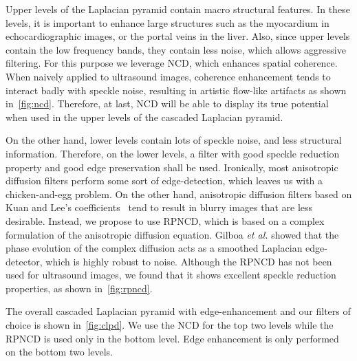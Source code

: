 %

Upper levels of the Laplacian pyramid contain macro structural features.
In these levels, it is important to enhance large structures such as the myocardium in echocardiographic images, or the portal veins in the liver.
Also, since upper levels contain the low frequency bands, they contain less noise, which allows aggressive filtering.
For this purpose we leverage NCD, which enhances spatial coherence.
When naively applied to ultrasound images, coherence enhancement tends to interact badly with speckle noise, resulting in artistic flow-like artifacts as shown in~\cref{fig:ncd}.
Therefore, at last, NCD will be able to display its true potential when used in the upper levels of the cascaded Laplacian pyramid.

On the other hand, lower levels contain lots of speckle noise, and less structural information.
Therefore, on the lower levels, a filter with good speckle reduction property and good edge preservation shall be used.
Ironically, most anisotropic diffusion filters perform some sort of edge-detection, which leaves us with a chicken-and-egg problem.
On the other hand, anisotropic diffusion filters based on Kuan and Lee's coefficients~\cite{yongjianyu_speckle_2002, aja-fernandez_estimation_2006, krissian_oriented_2007} tend to result in blurry images that are less desirable.
Instead, we propose to use RPNCD, which is based on a complex formulation of the anisotropic diffusion equation.
Gilboa \textit{et al.} showed that the phase evolution of the complex diffusion acts as a smoothed Laplacian edge-detector, which is highly robust to noise.
Although the RPNCD has not been used for ultrasound images, we found that it shows excellent speckle reduction properties, as shown in~\cref{fig:rpncd}.

The overall cascaded Laplacian pyramid with edge-enhancement and our filters of choice is shown in~\cref{fig:clpd}.
We use the NCD for the top two levels while the RPNCD is used only in the bottom level.
Edge enhancement is only performed on the bottom two levels.

